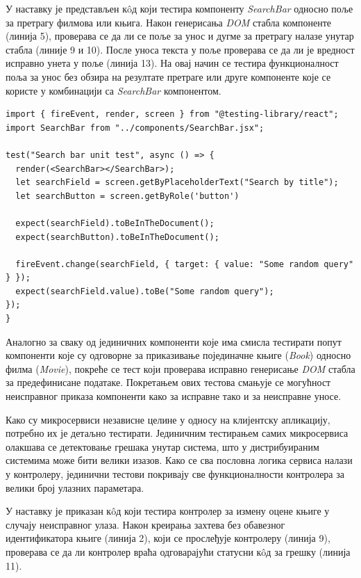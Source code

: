 \documentclass[12pt,oneside]{memoir}
\begin{document}
У наставку је представљен  к\^{o}д који тестира компоненту \textit{SearchBar} односно поље за претрагу филмова или књига. Након генерисања \textit{DOM} стабла компоненте (линија 5), проверава се да ли се поље за унос и дугме за претрагу налазе унутар стабла (линије 9 и 10). После уноса текста у поље проверава се да ли је вредност исправно унета у поље (линија 13). На овај начин се тестира функционалност поља за унос без обзира на резултате претраге или друге компоненте које се користе у комбинацији са \textit{SearchBar} компонентом.
\newpage

\begin{lstlisting}[caption=Јединично тестирање \textit{SearchBar} компоненте,
label={lst:searchbarTest},
frame=single]
import { fireEvent, render, screen } from "@testing-library/react";
import SearchBar from "../components/SearchBar.jsx";

test("Search bar unit test", async () => {
  render(<SearchBar></SearchBar>);
  let searchField = screen.getByPlaceholderText("Search by title");
  let searchButton = screen.getByRole('button')
  
  expect(searchField).toBeInTheDocument();
  expect(searchButton).toBeInTheDocument();

  fireEvent.change(searchField, { target: { value: "Some random query" } });
  expect(searchField.value).toBe("Some random query");
});
}
\end{lstlisting}

Аналогно за сваку од јединичних компоненти које има смисла тестирати попут компоненти које су одговорне за приказивање појединачне књиге (\textit{Book}) односно филма (\textit{Movie}), покреће се тест који проверава исправно генерисање \textit{DOM} стабла за предефинисане податаке. Покретањем ових тестова смањује се могућност неисправног приказа компоненти како за исправне тако и за неисправне уносе.

Како су микросервиси независне целине у односу на клијентску апликацију, потребно их је детаљно тестирати. Јединичним тестирањем самих микросервиса олакшава се детектовање грешака унутар система, што у дистрибуираним системима може бити велики изазов. Како се сва пословна логика сервиса налази у контролеру, јединични тестови покривају све функционалности контролера за велики број улазних параметара. 

У наставку је приказан к\^{o}д који тестира контролер за измену оцене књиге у случају неисправног улаза. Након креирања захтева без обавезног идентификатора књиге (линија 2), који се прослеђује контролеру (линија 9), проверава се да ли контролер враћа одговарајући статусни к\^{o}д за грешку (линија 11). 
\end{document}
